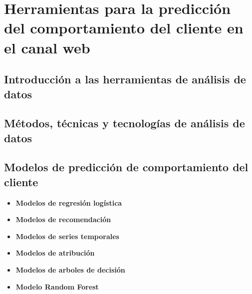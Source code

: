\documentclass[letterpaper, 12pt]{report}
\begin{document}
\section{Herramientas para la predicción del comportamiento del cliente en el canal web}

\subsection{Introducción a las herramientas de análisis de datos}


\subsection{Métodos, técnicas y tecnologías de análisis de datos}


\subsection{Modelos de predicción de comportamiento del cliente}

\begin{itemize}
  \item \textbf{Modelos de regresión logística} 
  \item \textbf{Modelos de recomendación} 
  \item \textbf{Modelos de series temporales} 
  \item \textbf{Modelos de atribución} 
  \item \textbf{Modelos de arboles de decisión} 
  \item \textbf{Modelo Random Forest} 
\end{itemize}
\end{document}
